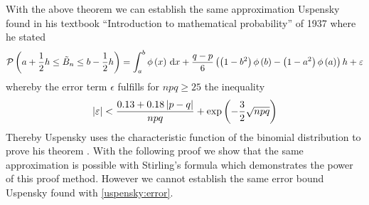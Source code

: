 \begin{remark}
  With the above theorem we can establish the same approximation Uspensky found in his textbook ``Introduction to mathematical probability'' of 1937 where he stated \cite[p. 129]{uspensky}
  \begin{align}
    \mathcal P\left({a+\frac 12h \le \tilde B_{n} \le b-\frac 12h}\right) = \int_a^b \phi\left( {x} \right) \,\mathrm d{x} + \frac{q-p}6 \left( {\left( {1-b^2} \right)\phi\left( {b} \right) - \left( {1-a^2} \right)\phi\left( {a} \right)} \right) h + \varepsilon
  \end{align}
  whereby the error term $\epsilon$ fulfills for $npq \ge 25$ the inequality
  \begin{align} \label{uspensky:error}
    \left|{\varepsilon}\right| < \frac{0.13+0.18\left|{p-q}\right|}{npq} + \exp\left( {-\frac 32 \sqrt{npq}} \right)
  \end{align}
  Thereby Uspensky uses the characteristic function of the binomial distribution to prove his theorem \cite[pp. 119-129]{uspensky}. With the following proof we show that the same approximation is possible with Stirling's formula which demonstrates the power of this proof method. However we cannot establish the same error bound Uspensky found with \eqref{uspensky:error}.
\end{remark}

